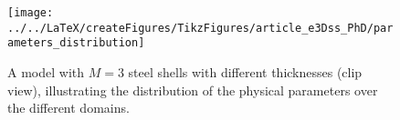\begin{figure}
	\centering
	\texttt{[image: ../../LaTeX/createFigures/TikzFigures/article\_e3Dss\_PhD/parameters\_distribution]}
	\caption{A model with $M=3$ steel shells with different thicknesses (clip view), illustrating the distribution of the physical parameters over the different domains.}
	\label{Fig1:illustration}
\end{figure}


